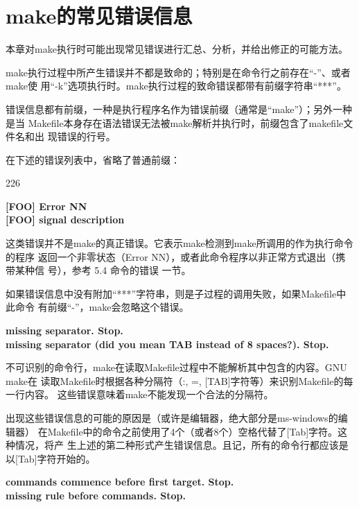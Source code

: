 ﻿\chapter{make的常见错误信息}

本章对make执行时可能出现常见错误进行汇总、分析，并给出修正的可能方法。

make执行过程中所产生错误并不都是致命的；特别是在命令行之前存在“-”、或者make使
用“-k”选项执行时。make执行过程的致命错误都带有前缀字符串“***”。

错误信息都有前缀，一种是执行程序名作为错误前缀（通常是“make”）；另外一种是当
Makefile本身存在语法错误无法被make解析并执行时，前缀包含了makefile文件名和出
现错误的行号。

在下述的错误列表中，省略了普通前缀：

\begin{dinglist}{226}
\itemsep=4pt \parskip=2pt

  \item \begin{minipage}[t]{\linewidth}
          \textbf{[FOO] Error NN} \\
          \textbf{[FOO] signal description}
        \end{minipage}

这类错误并不是make的真正错误。它表示make检测到make所调用的作为执行命令的程序
返回一个非零状态（Error NN），或者此命令程序以非正常方式退出（携带某种信
号），参考 5.4 命令的错误 一节。

如果错误信息中没有附加“***”字符串，则是子过程的调用失败，如果Makefile中此命令
有前缀“-”，make会忽略这个错误。

  \item \begin{minipage}[t]{\linewidth}
          \textbf{missing separator. Stop.} \\
          \textbf{missing separator (did you mean TAB instead of 8 spaces?). Stop.}
        \end{minipage}

不可识别的命令行，make在读取Makefile过程中不能解析其中包含的内容。GNU make在
读取Makefile时根据各种分隔符（:, =, [TAB]字符等）来识别Makefile的每一行内容。
这些错误意味着make不能发现一个合法的分隔符。

出现这些错误信息的可能的原因是（或许是编辑器，绝大部分是ms-windows的编辑器）
在Makefile中的命令之前使用了4个（或者8个）空格代替了[Tab]字符。这种情况，将产
生上述的第二种形式产生错误信息。且记，所有的命令行都应该是以[Tab]字符开始的。

  \item \begin{minipage}[t]{\linewidth}
          \textbf{commands commence before first target. Stop.} \\
          \textbf{missing rule before commands. Stop.}
        \end{minipage}


\end{dinglist}
